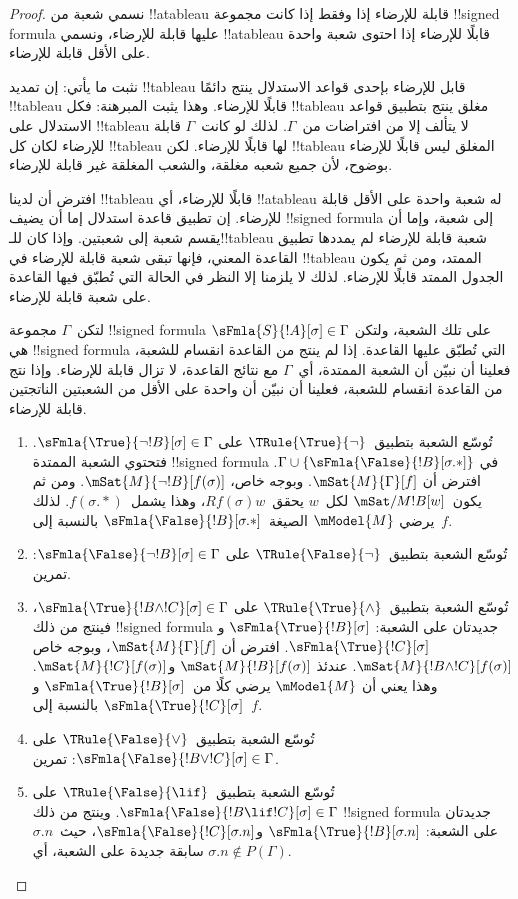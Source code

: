 \documentclass[../../../include/open-logic-section]{subfiles}
\begin{document}
\begin{proof}
نسمي شعبة من !!a{tableau} قابلة للإرضاء إذا وفقط إذا كانت مجموعة
!!{signed formula} عليها قابلة للإرضاء، ونسمي !!a{tableau} قابلًا
للإرضاء إذا احتوى شعبة واحدة على الأقل قابلة للإرضاء.

نثبت ما يأتي: إن تمديد !!{tableau} قابل للإرضاء بإحدى قواعد الاستدلال
ينتج دائمًا !!{tableau} قابلًا للإرضاء. وهذا يثبت المبرهنة: فكل
!!{tableau} مغلق ينتج بتطبيق قواعد الاستدلال على !!{tableau} لا يتألف
إلا من افتراضات من~$\Gamma$. لذلك لو كانت~$\Gamma$ قابلة للإرضاء لكان
كل !!{tableau} لها قابلًا للإرضاء. لكن !!{tableau} المغلق ليس قابلًا
للإرضاء بوضوح، لأن جميع شعبه مغلقة، والشعب المغلقة غير قابلة للإرضاء.

افترض أن لدينا !!{tableau} قابلًا للإرضاء، أي !!a{tableau} له شعبة
واحدة على الأقل قابلة للإرضاء. إن تطبيق قاعدة استدلال إما أن يضيف
!!{signed formula} إلى شعبة، وإما أن يقسم شعبة إلى شعبتين. وإذا كان
للـ!!{tableau} شعبة قابلة للإرضاء لم يمددها تطبيق القاعدة المعني، فإنها
تبقى شعبة قابلة للإرضاء في !!{tableau} الممتد، ومن ثم يكون الجدول الممتد
قابلًا للإرضاء. لذلك لا يلزمنا إلا النظر في الحالة التي تُطبّق فيها
القاعدة على شعبة قابلة للإرضاء.

لتكن~$\Gamma$ مجموعة !!{signed formula} على تلك الشعبة، ولتكن
$\sFmla{S}{!A}[\sigma] \in \Gamma$ هي !!{signed formula} التي تُطبّق
عليها القاعدة. إذا لم ينتج من القاعدة انقسام للشعبة، فعلينا أن نبيّن أن
الشعبة الممتدة، أي~$\Gamma$ مع نتائج القاعدة، لا تزال قابلة للإرضاء.
وإذا نتج من القاعدة انقسام للشعبة، فعلينا أن نبيّن أن واحدة على الأقل
من الشعبتين الناتجتين قابلة للإرضاء.
\begin{enumerate}
\item تُوسّع الشعبة بتطبيق~$\TRule{\True}{\lnot}$ على
  $\sFmla{\True}{\lnot !B}[\sigma] \in \Gamma$. فتحتوي الشعبة الممتدة
  !!{signed formula} في
  $\Gamma \cup \{\sFmla{\False}{!B}[\sigma.{*}]\}$. افترض أن
  $\mSat{M}{\Gamma}[f]$. وبوجه خاص،
  $\mSat{M}{\lnot !B}[f(\sigma)]$. ومن ثم يكون~$\mSat/{M}{!B}[w]$
  لكل~$w$ يحقق~$Rf(\sigma)w$، وهذا يشمل~$f(\sigma.{*})$. لذلك يرضي
  $\mModel{M}$ الصيغة~$\sFmla{\False}{!B}[\sigma.{*}]$ بالنسبة إلى~$f$.
\item تُوسّع الشعبة بتطبيق~$\TRule{\False}{\lnot}$ على
  $\sFmla{\False}{\lnot !B}[\sigma] \in \Gamma$: تمرين.
\item تُوسّع الشعبة بتطبيق~$\TRule{\True}{\land}$ على
  $\sFmla{\True}{!B \land !C}[\sigma] \in \Gamma$، فينتج من ذلك
  !!{signed formula} جديدتان على الشعبة:
  $\sFmla{\True}{!B}[\sigma]$ و$\sFmla{\True}{!C}[\sigma]$. افترض أن
  $\mSat{M}{\Gamma}[f]$، وبوجه خاص
  $\mSat{M}{!B \land !C}[f(\sigma)]$. عندئذ
  $\mSat{M}{!B}[f(\sigma)]$ و$\mSat{M}{!C}[f(\sigma)]$. وهذا يعني أن
  $\mModel{M}$ يرضي كلًا من~$\sFmla{\True}{!B}[\sigma]$
  و$\sFmla{\True}{!C}[\sigma]$ بالنسبة إلى~$f$.
\item تُوسّع الشعبة بتطبيق~$\TRule{\False}{\lor}$ على
  $\sFmla{\False}{!B \lor !C}[\sigma] \in \Gamma$: تمرين.
\item تُوسّع الشعبة بتطبيق~$\TRule{\False}{\lif}$ على
  $\sFmla{\False}{!B \lif !C}[\sigma] \in \Gamma$. وينتج من ذلك
  !!{signed formula} جديدتان على الشعبة:
  $\sFmla{\True}{!B}[\sigma.n]$ و$\sFmla{\False}{!C}[\sigma.n]$،
  حيث~$\sigma.n$ سابقة جديدة على الشعبة، أي
  $\sigma.n \notin P(\Gamma)$.


\end{enumerate}
\end{proof}
\end{document}

